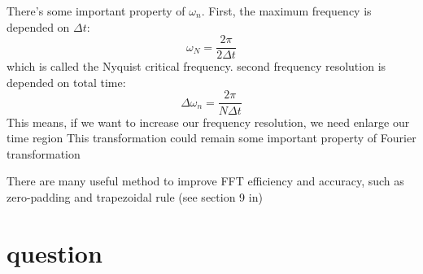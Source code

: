 \documentclass[12pt,a4paper,scale=1.0]{article}
\begin{document}
 	There's some important property of ${\omega_n}$. First, the maximum frequency is depended on $\Delta t$:
 	\begin{equation}\label{equ:4-3}
 	\omega_N= \frac{2\pi}{2\Delta t}
 	\end{equation}
 	which is called the Nyquist critical frequency. second frequency resolution is depended on total time:
 	\begin{equation}\label{equ:4-4}
 	\Delta \omega_n = \frac{2\pi}{N\Delta t}
 	\end{equation}
 	This means, if we want to increase our frequency resolution, we need enlarge our time region
 	This transformation could remain some important property of Fourier transformation
 	
 	There are many useful method to improve FFT efficiency and accuracy, such as zero-padding and trapezoidal rule (see section 9 in\cite{hamm_zanni_2011})
	
	
	
	\section{question}

	
 	
	
	

	
\end{document}
